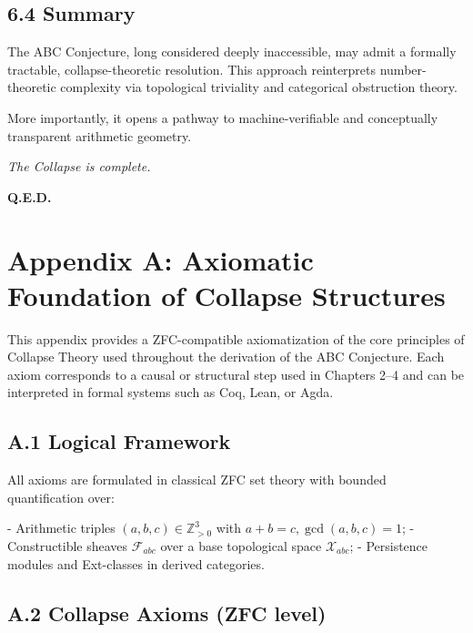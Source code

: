 \documentclass[11pt]{article}
\begin{document}
\subsection{6.4 Summary}

The ABC Conjecture, long considered deeply inaccessible, may admit a formally tractable, collapse-theoretic resolution. This approach reinterprets number-theoretic complexity via topological triviality and categorical obstruction theory.

More importantly, it opens a pathway to machine-verifiable and conceptually transparent arithmetic geometry.

\begin{center}
    \textit{The Collapse is complete.}
\end{center}

\hfill \textbf{Q.E.D.}



\section*{Appendix A: Axiomatic Foundation of Collapse Structures}

This appendix provides a ZFC-compatible axiomatization of the core principles of Collapse Theory  
used throughout the derivation of the ABC Conjecture. Each axiom corresponds to a causal or structural step  
used in Chapters 2–4 and can be interpreted in formal systems such as Coq, Lean, or Agda.

\subsection*{A.1 Logical Framework}

All axioms are formulated in classical ZFC set theory with bounded quantification over:

- Arithmetic triples \( (a,b,c) \in \mathbb{Z}_{>0}^3 \) with \( a + b = c, \gcd(a,b,c)=1 \);
- Constructible sheaves \( \mathcal{F}_{abc} \) over a base topological space \( \mathcal{X}_{abc} \);
- Persistence modules and Ext-classes in derived categories.

\subsection*{A.2 Collapse Axioms (ZFC level)}
\end{document}

